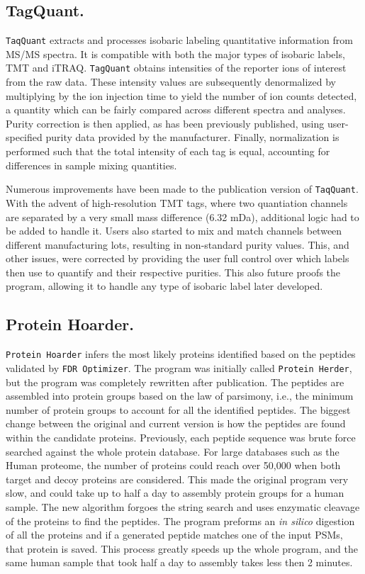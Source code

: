 \subsection*{TagQuant.}
\texttt{TaqQuant} extracts and processes isobaric labeling quantitative information from MS/MS spectra. It is compatible with both the major types of isobaric labels, TMT and iTRAQ. \texttt{TagQuant} obtains intensities of the reporter ions of interest from the raw data. These intensity values are subsequently denormalized by multiplying by the ion injection time to yield the number of ion counts detected, a quantity which can be fairly compared across different spectra and analyses. Purity correction is then applied, as has been previously published,\cite{itracker} using user-specified purity data provided by the manufacturer. Finally, normalization is performed such that the total intensity of each tag is equal, accounting for differences in sample mixing quantities.

Numerous improvements have been made to the publication version of \texttt{TaqQuant}. With the advent of high-resolution TMT tags, where two quantiation channels are separated by a very small mass difference (6.32 mDa), additional logic had to be added to handle it. Users also started to mix and match channels between different manufacturing lots, resulting in non-standard purity values. This, and other issues, were corrected by providing the user full control over which labels then use to quantify and their respective purities. This also future proofs the program, allowing it to handle any type of isobaric label later developed.

\subsection*{Protein Hoarder.}
\texttt{Protein Hoarder} infers the most likely proteins identified based on the peptides validated by \texttt{FDR Optimizer}. The program was initially called \texttt{Protein Herder}, but the program was completely rewritten after publication. 
The peptides are assembled into protein groups based on the law of parsimony, i.e., the minimum number of protein groups to account for all the identified peptides. The biggest change between the original and current version is how the peptides are found within the candidate proteins. Previously, each peptide sequence was brute force searched against the whole protein database. For large databases such as the Human proteome, the number of proteins could reach over 50,000 when both target and decoy proteins are considered. This made the original program very slow, and could take up to half a day to assembly protein groups for a human sample. The new algorithm forgoes the string search and uses enzymatic cleavage of the proteins to find the peptides. The program preforms an \emph{in silico} digestion of all the proteins and if a generated peptide matches one of the input PSMs, that protein is saved. This process greatly speeds up the whole program, and the same human sample that took half a day to assembly takes less then 2 minutes. 

